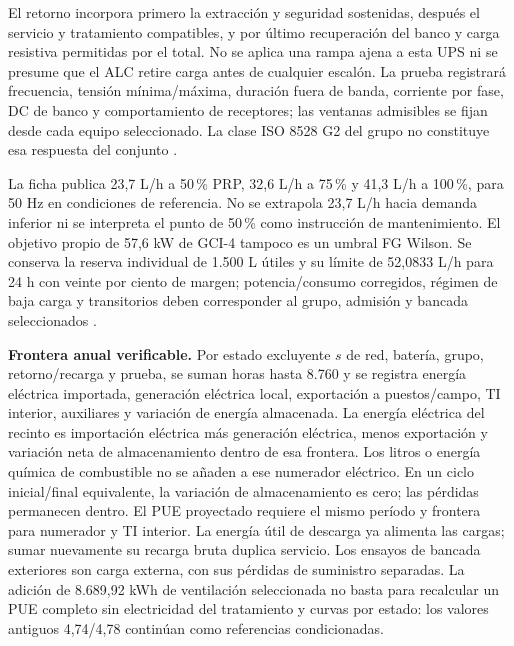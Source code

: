 El retorno incorpora primero la extracción y seguridad sostenidas, después el servicio y tratamiento compatibles, y por último recuperación del banco y carga resistiva permitidas por el total. No se aplica una rampa ajena a esta UPS ni se presume que el ALC retire carga antes de cualquier escalón. La prueba registrará frecuencia, tensión mínima/máxima, duración fuera de banda, corriente por fase, DC de banco y comportamiento de receptores; las ventanas admisibles se fijan desde cada equipo seleccionado. La clase ISO 8528 G2 del grupo no constituye esa respuesta del conjunto \parencite{p7-fg-p200-ficha}.

La ficha publica 23,7 L/h a 50\,\% PRP, 32,6 L/h a 75\,\% y 41,3 L/h a 100\,\%, para 50 Hz en condiciones de referencia. No se extrapola 23,7 L/h hacia demanda inferior ni se interpreta el punto de 50\,\% como instrucción de mantenimiento. El objetivo propio de 57,6 kW de GCI-4 tampoco es un umbral FG Wilson. Se conserva la reserva individual de 1.500 L útiles y su límite de 52,0833 L/h para 24 h con veinte por ciento de margen; potencia/consumo corregidos, régimen de baja carga y transitorios deben corresponder al grupo, admisión y bancada seleccionados \parencite[pp.~1--3]{p7-fg-p200-ficha}.

\textbf{Frontera anual verificable.} Por estado excluyente $s$ de red, batería, grupo, retorno/recarga y prueba, se suman horas hasta 8.760 y se registra energía eléctrica importada, generación eléctrica local, exportación a puestos/campo, TI interior, auxiliares y variación de energía almacenada. La energía eléctrica del recinto es importación eléctrica más generación eléctrica, menos exportación y variación neta de almacenamiento dentro de esa frontera. Los litros o energía química de combustible no se añaden a ese numerador eléctrico. En un ciclo inicial/final equivalente, la variación de almacenamiento es cero; las pérdidas permanecen dentro. El PUE proyectado requiere el mismo período y frontera para numerador y TI interior. La energía útil de descarga ya alimenta las cargas; sumar nuevamente su recarga bruta duplica servicio. Los ensayos de bancada exteriores son carga externa, con sus pérdidas de suministro separadas. La adición de 8.689,92 kWh de ventilación seleccionada no basta para recalcular un PUE completo sin electricidad del tratamiento y curvas por estado: los valores antiguos 4,74/4,78 continúan como referencias condicionadas.
